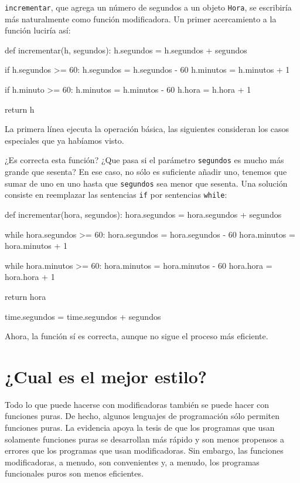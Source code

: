 \texttt{incrementar}, que agrega un número de segundos a un objeto
\texttt{Hora}, se escribiría más naturalmente como función modificadora.
Un primer acercamiento a la función luciría así:
\begin{pythoncode}
def incrementar(h, segundos):
  h.segundos = h.segundos + segundos

  if h.segundos >= 60:
    h.segundos = h.segundos - 60
    h.minutos = h.minutos + 1

  if h.minuto >= 60:
    h.minutos = h.minutos - 60
    h.hora = h.hora + 1

  return h
\end{pythoncode}

La primera línea ejecuta la operación básica, las siguientes consideran
los casos especiales que ya habíamos visto.

¿Es correcta esta función? ¿Que pasa si el parámetro \texttt{segundos}
es mucho más grande que sesenta? En ese caso, no sólo es suficiente
añadir uno, tenemos que sumar de uno en uno hasta que \texttt{segundos}
sea menor que sesenta. Una solución consiste en reemplazar las sentencias
\texttt{if} por sentencias \texttt{while}:
\begin{pythoncode}
def incrementar(hora, segundos):
  hora.segundos = hora.segundos + segundos

  while hora.segundos >= 60:
    hora.segundos = hora.segundos - 60
    hora.minutos = hora.minutos + 1

  while hora.minutos >= 60:
    hora.minutos = hora.minutos - 60
    hora.hora = hora.hora + 1

  return hora

  time.segundos = time.segundos + segundos
\end{pythoncode}

Ahora, la función sí es correcta, aunque no sigue el proceso más eficiente.

\section{¿Cual es el mejor estilo?}


Todo lo que puede hacerse con modificadoras también se puede hacer
con funciones puras. De hecho, algunos lenguajes de programación sólo
permiten funciones puras. La evidencia apoya la tesis de que los programas
que usan solamente funciones puras se desarrollan más rápido y son
menos propensos a errores que los programas que usan modificadoras.
Sin embargo, las funciones modificadoras, a menudo, son convenientes
y, a menudo, los programas funcionales puros son menos eficientes.

